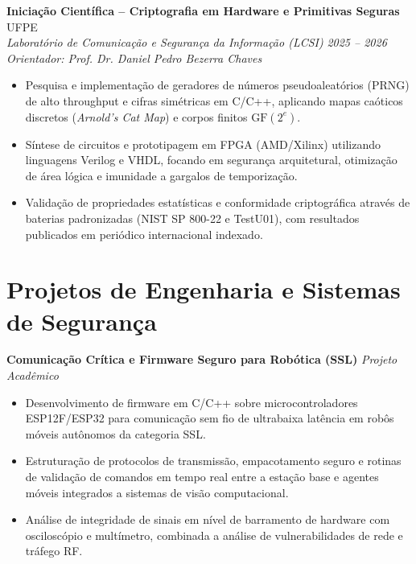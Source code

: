 \documentclass[11pt,a4paper]{article}
\begin{document}
\textbf{Iniciação Científica -- Criptografia em Hardware e Primitivas Seguras} \hfill UFPE \\
\textit{Laboratório de Comunicação e Segurança da Informação (LCSI)} \hfill \textit{2025 -- 2026} \\
\textit{Orientador: Prof. Dr. Daniel Pedro Bezerra Chaves}
\begin{itemize}[leftmargin=*, noitemsep]
    \item Pesquisa e implementação de geradores de números pseudoaleatórios (PRNG) de alto throughput e cifras simétricas em C/C++, aplicando mapas caóticos discretos (\textit{Arnold's Cat Map}) e corpos finitos $\mathrm{GF}(2^e)$.
    \item Síntese de circuitos e prototipagem em FPGA (AMD/Xilinx) utilizando linguagens Verilog e VHDL, focando em segurança arquitetural, otimização de área lógica e imunidade a gargalos de temporização.
    \item Validação de propriedades estatísticas e conformidade criptográfica através de baterias padronizadas (NIST SP 800-22 e TestU01), com resultados publicados em periódico internacional indexado.
\end{itemize}

\newpage

\section*{Projetos de Engenharia e Sistemas de Segurança}

\textbf{Comunicação Crítica e Firmware Seguro para Robótica (SSL)} \hfill \textit{Projeto Acadêmico}
\begin{itemize}[leftmargin=*, noitemsep]
    \item Desenvolvimento de firmware em C/C++ sobre microcontroladores ESP12F/ESP32 para comunicação sem fio de ultrabaixa latência em robôs móveis autônomos da categoria SSL.
    \item Estruturação de protocolos de transmissão, empacotamento seguro e rotinas de validação de comandos em tempo real entre a estação base e agentes móveis integrados a sistemas de visão computacional.
    \item Análise de integridade de sinais em nível de barramento de hardware com osciloscópio e multímetro, combinada a análise de vulnerabilidades de rede e tráfego RF.
\end{itemize}

\vspace{0.25cm}
\end{document}
